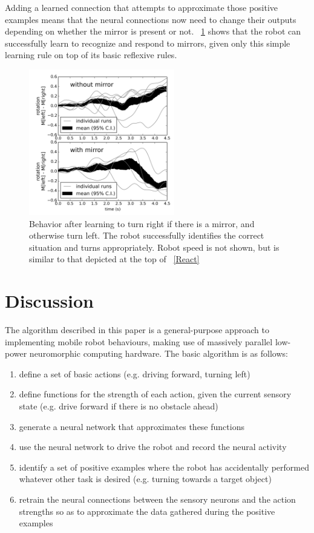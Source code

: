\documentclass{frontiersSCNS}
\begin{document}
Adding a learned connection that attempts to approximate those positive
examples means that the neural connections now need to change their outputs
depending on whether the mirror is present or not.  \figurename~\ref{Right} shows 
that the robot can successfully learn to recognize and respond to mirrors,
given only this simple learning rule on top of its basic reflexive rules.

\begin{figure}[!t]
\centering
\includegraphics[width=2.5in]{../figures/learn-mirror/learnmirror.png}
\caption{Behavior after learning to turn right if there is a mirror, and otherwise turn left. The robot successfully identifies the correct situation and turns appropriately. Robot speed is not shown, but is similar to that depicted at the top of \figurename~\ref{React}}
\label{Right}
\end{figure}

\section{Discussion}
The algorithm described in this paper is a general-purpose approach to
implementing mobile robot behaviours, 
making use of massively parallel low-power neuromorphic computing hardware. 
The basic algorithm is as follows:

\begin{enumerate}
\item define a set of basic actions (e.g. driving forward, turning left)
\item define functions for the strength of each action, given the
current sensory state (e.g. drive forward if there is no obstacle ahead)
\item generate a neural network that approximates these functions
\item use the neural network to drive the robot and record the neural activity
\item identify a set of positive examples where the robot has accidentally
performed whatever other task is desired (e.g. turning towards a target object)
\item retrain the neural connections between the sensory neurons and the
action strengths so as to approximate the data gathered during the positive
examples
\end{enumerate}
\end{document}
